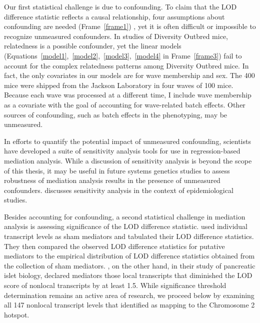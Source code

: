 \documentclass[oneside]{book}\usepackage[]{graphicx}\usepackage[]{color}
\begin{document}
Our first statistical challenge is due to confounding. To claim that the LOD 
difference statistic reflects a causal relationship, four assumptions about 
confounding are needed (Frame~\ref{frame1}) \citep{vanderweele2015explanation}, 
yet
it is often difficult or impossible to recognize unmeasured confounders. 
In studies of Diversity Outbred mice, relatedness is a possible confounder, 
yet the linear models (Equations~\ref{model1},~\ref{model2},~\ref{model3},~\ref{model4}
in Frame~\ref{frame3}) fail to account for the complex relatedness patterns 
among Diversity Outbred mice. 
In fact, the only covariates in our models are for wave membership and sex.
The 400 mice were shipped from the Jackson Laboratory in four waves of 100 mice. 
Because each wave was processed at a different time, I include wave membership 
as a covariate with the goal of accounting for wave-related batch effects.
Other sources of confounding, such as batch effects in the phenotyping, may be 
unmeasured.

In efforts to quantify the potential impact of unmeasured confounding, scientists have 
developed a suite of sensitivity analysis tools for use in regression-based mediation analysis.
While a discussion of sensitivity analysis is beyond the scope of this thesis, 
it may be useful in future systems genetics studies to assess robustness of mediation analysis
results in the presence of unmeasured confounders. 
\citet{vanderweele2015explanation} discusses sensitivity analysis in the context of epidemiological studies. 








Besides accounting for confounding, a second statistical challenge in mediation analysis is assessing significance of the LOD difference statistic. 
\citet{chick2016defining} used individual transcript levels as sham mediators and tabulated their LOD difference statistics. 
They then compared the observed LOD difference statistics for putative mediators to the empirical distribution of LOD difference statistics obtained from the collection of sham mediators. 
\citet{keller2018genetic}, on the other hand, in their study of pancreatic islet 
biology, declared mediators those local transcripts that diminished the LOD score 
of nonlocal transcripts by at least 1.5. 
While significance threshold determination remains an active area of research, 
we proceed below by examining all 147 nonlocal transcript levels that 
\citet{keller2018genetic} identified as mapping to the Chromosome 2 hotspot.
\end{document}
